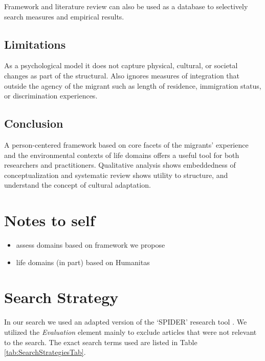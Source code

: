 \documentclass[man, 12pt, a4paper]{apa7}
\begin{document}
Framework and literature review can also be used as a database to selectively search measures and empirical results.
\subsection{Limitations}
As a psychological model it does not capture physical, cultural, or societal changes as part of the structural. Also ignores measures of integration that outside the agency of the migrant such as length of residence, immigration status, or discrimination experiences.

\subsection{Conclusion}
A person-centered framework based on core facets of the migrants’ experience and the environmental contexts of life domains offers a useful tool for both researchers and practitioners. Qualitative analysis shows embeddedness of conceptualization and systematic review shows utility to structure, and understand the concept of cultural adaptation.

\section{Notes to self}
\begin{itemize}
  \item assess domains based on framework we propose
  \item life domains (in part) based on Humanitas
\end{itemize}

\printbibliography

\appendix

\section{Search Strategy}
\label{app:AppendixSearchStrategy}

In our search we used an adapted version of the `SPIDER' research tool \citep[e.g.,][]{Cooke2012}. We utilized the \textit{Evaluation} element mainly to exclude articles that were not relevant to the search. The exact search terms used are listed in Table \ref{tab:SearchStrategiesTab}.



\end{document}
